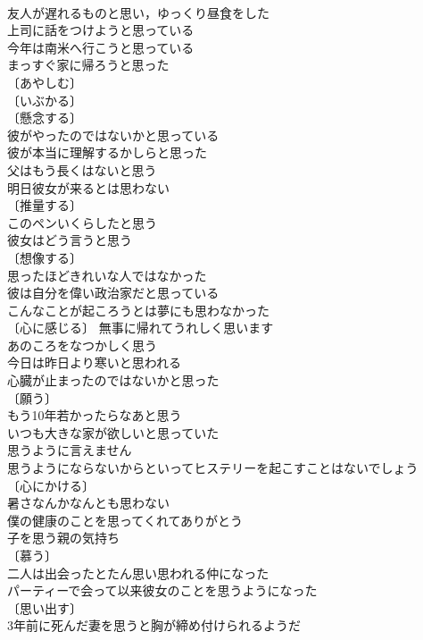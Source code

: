 \documentclass[8pt]{extreport}
\begin{document}
\begin{CJK}{UTF8}{min}
\\	友人が遅れるものと思い，ゆっくり昼食をした 
\\	上司に話をつけようと思っている 
\\	今年は南米へ行こうと思っている 
\\	まっすぐ家に帰ろうと思った 
\\	〔あやしむ〕
\\	〔いぶかる〕
\\	〔懸念する〕
\\	彼がやったのではないかと思っている 
\\	彼が本当に理解するかしらと思った 
\\	父はもう長くはないと思う 
\\	明日彼女が来るとは思わない 
\\	〔推量する〕
\\	このペンいくらしたと思う 
\\	彼女はどう言うと思う 
\\	〔想像する〕
\\	思ったほどきれいな人ではなかった 
\\	彼は自分を偉い政治家だと思っている 
\\	こんなことが起ころうとは夢にも思わなかった 
\\	〔心に感じる〕 無事に帰れてうれしく思います 
\\	あのころをなつかしく思う 
\\	今日は昨日より寒いと思われる 
\\	心臓が止まったのではないかと思った 
\\	〔願う〕
\\	もう10年若かったらなあと思う 
\\	いつも大きな家が欲しいと思っていた 
\\	思うように言えません 
\\	思うようにならないからといってヒステリーを起こすことはないでしょう 
\\	〔心にかける〕
\\	暑さなんかなんとも思わない 
\\	僕の健康のことを思ってくれてありがとう 
\\	子を思う親の気持ち 
\\	〔慕う〕
\\	二人は出会ったとたん思い思われる仲になった 
\\	パーティーで会って以来彼女のことを思うようになった 
\\	〔思い出す〕
\\	3年前に死んだ妻を思うと胸が締め付けられるようだ 

\end{CJK}
\end{document}
